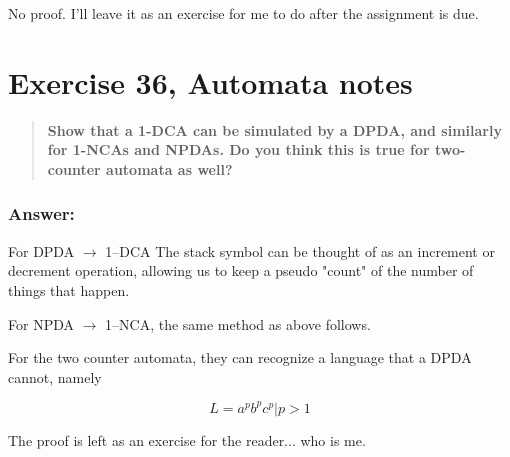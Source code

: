 \documentclass[titlepage]{article}\usepackage[]{graphicx}\usepackage[]{color}
\begin{document}
No proof. I'll leave it as an exercise for me to do after the assignment is
due.

\section{Exercise 36, Automata notes}
\begin{quote}
  \textbf{Show that a 1-DCA can be simulated by a DPDA, and similarly for
  1-NCAs and NPDAs. Do you think this is true for two-counter automata as well?}
\end{quote}
\subsubsection{Answer:}

For DPDA $\to$ 1--DCA The stack symbol can be thought of as an increment or
decrement operation, allowing us to keep a pseudo "count" of the number of
things that happen.

For NPDA $\to$ 1--NCA, the same method as above follows.

For the two counter automata, they can recognize a language that a DPDA cannot,
namely

\[ L = a^p b^p c^p | p > 1\]

The proof is left as an exercise for the reader... who is me.
\end{document}
